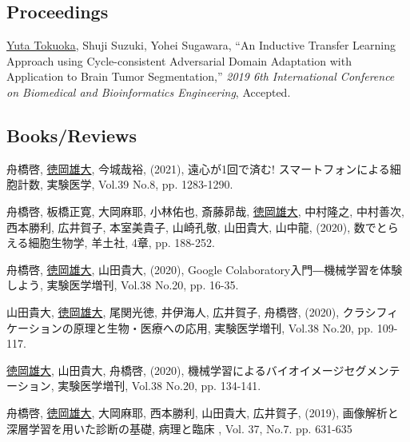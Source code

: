 \documentclass[letterpaper]{article}
\renewenvironment{itemize}{
  \begin{list}{}{
    \setlength{\leftmargin}{1.5em}
  }
}{
  \end{list}
}
\begin{document}
\subsection*{\bf Proceedings}

\begin{itemize}
 \item \underline{Yuta Tokuoka}, Shuji Suzuki, Yohei Sugawara,
       ``An Inductive Transfer Learning Approach using Cycle-consistent Adversarial Domain Adaptation with Application to Brain Tumor Segmentation,''
       {\itshape 2019 6th International Conference on Biomedical and Bioinformatics Engineering}, Accepted.
\end{itemize}





\subsection*{\bf Books/Reviews}

\begin{itemize}
 \item 舟橋啓, \underline{徳岡雄大}, 今城哉裕, (2021), 遠心が1回で済む! スマートフォンによる細胞計数, 実験医学, Vol.39 No.8, pp. 1283-1290.
 \item 舟橋啓, 板橋正寛, 大岡麻耶, 小林佑也, 斎藤昴哉, \underline{徳岡雄大}, 中村隆之, 中村善次, 西本勝利, 広井賀子, 本室美貴子, 山崎孔敬, 山田貴大, 山中龍, (2020), 数でとらえる細胞生物学, 羊土社, 4章, pp. 188-252.
 \item 舟橋啓, \underline{徳岡雄大}, 山田貴大, (2020), Google Colaboratory入門―機械学習を体験しよう, 実験医学増刊, Vol.38 No.20, pp. 16-35.
 \item 山田貴大, \underline{徳岡雄大}, 尾関光徳, 井伊海人, 広井賀子, 舟橋啓, (2020), クラシフィケーションの原理と生物・医療への応用, 実験医学増刊, Vol.38 No.20, pp. 109-117.
 \item \underline{徳岡雄大}, 山田貴大, 舟橋啓, (2020), 機械学習によるバイオイメージセグメンテーション, 実験医学増刊, Vol.38 No.20, pp. 134-141.
 \item 舟橋啓, \underline{徳岡雄大}, 大岡麻耶, 西本勝利, 山田貴大, 広井賀子, (2019), 画像解析と深層学習を用いた診断の基礎, 病理と臨床 , Vol. 37, No.7. pp. 631-635
\end{itemize}
\end{document}
